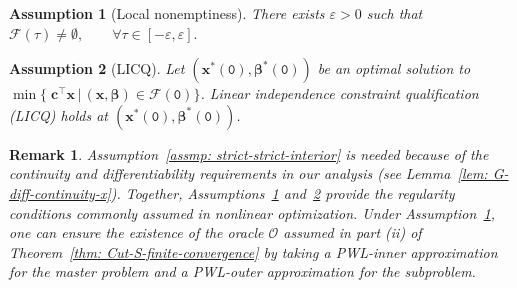 \documentclass[opre,sglanonrev]{informs4}
\newtheorem{assumption}{Assumption}
\newtheorem{remark}{Remark}
\newcommand{\mF}{\mathcal{F}}
\newcommand{\bbeta}{\bm{\beta}}
\newcommand{\bc}{\bm{c}}
\newcommand{\bx}{\bm{x}}
\begin{document}
{%

\begin{assumption}[Local nonemptiness]
\label{assmp: non-empty-interior}
There exists \(\varepsilon>0\) such that $\mF(\tau)\neq\emptyset,
\qquad
\forall \tau\in[-\varepsilon,\varepsilon].$
\end{assumption}

\begin{assumption}[LICQ]\label{assmp: LICQ}
 Let $(\bx^*(\mathtt{0}), \bbeta^*(\mathtt{0}))$ be an optimal solution to $\min \{\;\bc^\top \bx \, |\, (\bx, \bbeta) \in \mF(\mathtt{0})\}$. Linear independence constraint qualification (LICQ) holds at $(\bx^*(\mathtt{0}), \bbeta^*(\mathtt{0}))$. 
\end{assumption}




\begin{remark} Assumption~\ref{assmp: strict-strict-interior} is needed because of the continuity and differentiability requirements in our analysis (see Lemma~\ref{lem: G-diff-continuity-x}). Together, Assumptions~\ref{assmp: non-empty-interior} and~\ref{assmp: LICQ} provide the regularity conditions commonly assumed in nonlinear optimization. Under Assumption~\ref{assmp: non-empty-interior}, one can ensure the existence of the oracle $\mathcal{O}$ assumed in part (ii) of Theorem~\ref{thm: Cut-S-finite-convergence} by taking a PWL-inner approximation for the master problem and a PWL-outer approximation for the subproblem. 
\end{remark}

}
\end{document}
